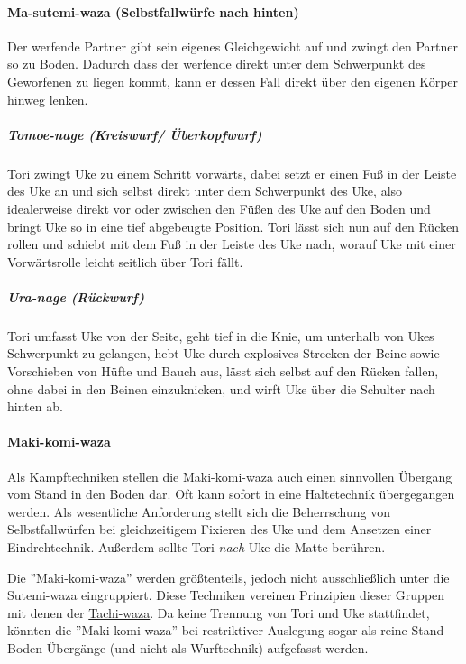 \documentclass[justified, a4paper, notitlepage, captions=tableheading, nobib]{tufte-handout}
\begin{document}
\paragraph{Ma-sutemi-waza (Selbstfallwürfe nach hinten) }
\label{sec:org54f679a}

Der werfende Partner gibt sein eigenes Gleichgewicht auf und zwingt den Partner so zu Boden. Dadurch dass der werfende direkt unter dem Schwerpunkt des Geworfenen zu liegen kommt, kann er dessen Fall direkt über den eigenen Körper hinweg lenken.

\subparagraph{Tomoe-nage (Kreiswurf/ Überkopfwurf)}
\label{sec:org416e053}

Tori zwingt Uke zu einem Schritt vorwärts, dabei setzt er einen Fuß in der Leiste des Uke an und sich selbst direkt unter dem Schwerpunkt des Uke, also idealerweise direkt vor oder zwischen den Füßen des Uke auf den Boden und bringt Uke so in eine tief abgebeugte Position. Tori lässt sich nun auf den Rücken rollen und schiebt mit dem Fuß in der Leiste des Uke nach, worauf Uke mit einer Vorwärtsrolle leicht seitlich über Tori fällt.

\subparagraph{Ura-nage (Rückwurf)}
\label{sec:org103b293}

Tori umfasst Uke von der Seite, geht tief in die Knie, um unterhalb von Ukes Schwerpunkt zu gelangen, hebt Uke durch explosives Strecken der Beine sowie Vorschieben von Hüfte und Bauch aus, lässt sich selbst auf den Rücken fallen, ohne dabei in den Beinen einzuknicken, und wirft Uke über die Schulter nach hinten ab.

\paragraph{Maki-komi-waza }
\label{sec:org5b3981b}

Als Kampftechniken stellen die Maki-komi-waza auch einen sinnvollen Übergang vom Stand in den Boden dar. Oft kann sofort in eine Haltetechnik übergegangen werden. Als wesentliche Anforderung stellt sich die Beherrschung von Selbstfallwürfen bei gleichzeitigem Fixieren des Uke und dem Ansetzen einer Eindrehtechnik. Außerdem sollte Tori \emph{nach} Uke die Matte berühren.

Die ''Maki-komi-waza'' werden größtenteils, jedoch nicht ausschließlich unter die Sutemi-waza eingruppiert. Diese Techniken vereinen Prinzipien dieser Gruppen mit denen der \hyperref[orgae58a29]{Tachi-waza}. Da keine Trennung von Tori und Uke stattfindet, könnten die ''Maki-komi-waza'' bei restriktiver Auslegung sogar als reine Stand-Boden-Übergänge (und nicht als Wurftechnik) aufgefasst werden.
\end{document}
